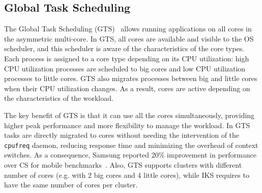 

\subsection{Global Task Scheduling}
\label{sec.study.scheduling.gts}
The Global Task Scheduling (GTS)~\cite{samsung}
allows running applications on all cores in the asymmetric multi-core. In GTS, all cores are 
available and visible to the OS scheduler, and this scheduler is aware of the characteristics of 
the core types. Each process is assigned to a core type depending on its CPU utilization:
high CPU utilization processes are scheduled to big cores and low CPU utilization processes to 
little cores. GTS also migrates processes between big and little cores when their CPU utilization 
changes. As a result, cores are active depending on the characteristics of the workload. 

The key benefit of GTS is that it can use all the cores simultaneously, providing higher peak 
performance and more flexibility to manage the workload. In GTS tasks are directly migrated to cores 
without needing the intervention of the \texttt{cpufreq} daemon, reducing response time and 
minimizing the overhead of context switches. As a consequence, Samsung reported 20\% improvement in 
performance over CS for mobile benchmarks~\cite{samsung}. Also, GTS supports clusters with 
different number of cores (e.g. with 2 big cores and 4 little cores), while IKS requires to have 
the same number of cores per cluster.

